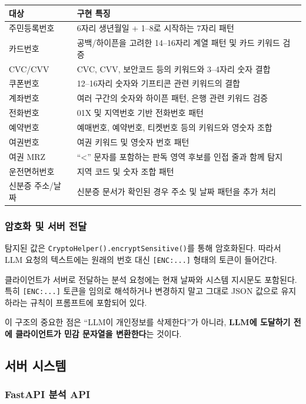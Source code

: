 \documentclass[11pt,a4paper]{article}
\begin{document}
\begin{longtable}{p{3.4cm}p{7.8cm}}
\toprule
\textbf{대상} & \textbf{구현 특징}\\
\midrule
주민등록번호 & 6자리 생년월일 + 1--8로 시작하는 7자리 패턴\\
카드번호 & 공백/하이픈을 고려한 14--16자리 계열 패턴 및 카드 키워드 검증\\
CVC/CVV & CVC, CVV, 보안코드 등의 키워드와 3--4자리 숫자 결합\\
쿠폰번호 & 12--16자리 숫자와 기프티콘 관련 키워드의 결합\\
계좌번호 & 여러 구간의 숫자와 하이픈 패턴, 은행 관련 키워드 검증\\
전화번호 & 01X 및 지역번호 기반 전화번호 패턴\\
예약번호 & 예매번호, 예약번호, 티켓번호 등의 키워드와 영숫자 조합\\
여권번호 & 여권 키워드 및 영숫자 번호 패턴\\
여권 MRZ & ``<'' 문자를 포함하는 판독 영역 후보를 인접 줄과 함께 탐지\\
운전면허번호 & 지역 코드 및 숫자 조합 패턴\\
신분증 주소/날짜 & 신분증 문서가 확인된 경우 주소 및 날짜 패턴을 추가 처리\\
\bottomrule
\end{longtable}

\subsubsection{암호화 및 서버 전달}

탐지된 값은 \texttt{CryptoHelper().encryptSensitive()}를 통해 암호화된다. 따라서 LLM 요청의 텍스트에는 원래의 번호 대신 \texttt{[ENC:...]} 형태의 토큰이 들어간다.

클라이언트가 서버로 전달하는 분석 요청에는 현재 날짜와 시스템 지시문도 포함된다. 특히 \texttt{[ENC:...]} 토큰을 임의로 해석하거나 변경하지 말고 그대로 JSON 값으로 유지하라는 규칙이 프롬프트에 포함되어 있다.

이 구조의 중요한 점은 ``LLM이 개인정보를 삭제한다''가 아니라, \textbf{LLM에 도달하기 전에 클라이언트가 민감 문자열을 변환한다}는 것이다.

\subsection{서버 시스템}

\subsubsection{FastAPI 분석 API}
\end{document}

